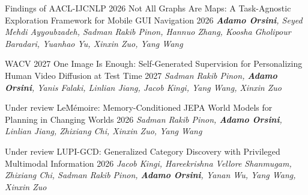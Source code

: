 

\begin{cventries}

  \cventry
    {Findings of AACL-IJCNLP 2026}
    {Not All Graphs Are Maps: A Task-Agnostic Exploration Framework for Mobile GUI Navigation}
    {}
    {2026}
    {\textit{\textbf{Adamo Orsini}, Seyed Mehdi Ayyoubzadeh, Sadman Rakib Pinon, Hannuo Zhang, Koosha Gholipour Baradari, Yuanhao Yu, Xinxin Zuo, Yang Wang}}

  \cventry
    {WACV 2027}
    {One Image Is Enough: Self-Generated Supervision for Personalizing Human Video Diffusion at Test Time}
    {}
    {2027}
    {\textit{Sadman Rakib Pinon, \textbf{Adamo Orsini}, Yanis Falaki, Linlian Jiang, Jacob Kingi, Yang Wang, Xinxin Zuo}}

  \cventry
    {Under review}
    {LeMémoire: Memory-Conditioned JEPA World Models for Planning in Changing Worlds}
    {}
    {2026}
    {\textit{Sadman Rakib Pinon, \textbf{Adamo Orsini}, Linlian Jiang, Zhixiang Chi, Xinxin Zuo, Yang Wang}}

  \cventry
    {Under review}
    {LUPI-GCD: Generalized Category Discovery with Privileged Multimodal Information}
    {}
    {2026}
    {\textit{Jacob Kingi, Hareekrishna Vellore Shanmugam, Zhixiang Chi, Sadman Rakib Pinon, \textbf{Adamo Orsini}, Yanan Wu, Yang Wang, Xinxin Zuo}}

\end{cventries}
